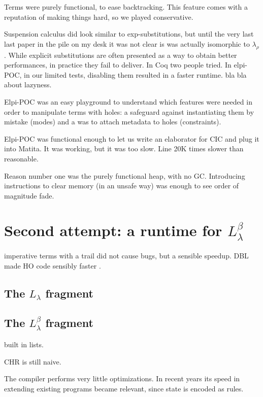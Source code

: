 \documentclass[a4paper, 11pt]{book}
\begin{document}
Terms were purely functional, to ease backtracking. This feature comes
with a reputation of making things hard, so we played conservative.

Suspension calculus did look similar to exp-substitutions, but until the very
last last paper in the pile on my desk it was not clear is was actually isomorphic
to $\lambda_\rho$. While explicit substitutions are often presented as a way to
obtain better performances, in practice they fail to deliver. In Coq two
people tried. In elpi-POC, in our limited tests, disabling them resulted in
a faster runtime.  bla bla about lazyness.

Elpi-POC was an easy playground to understand which features were needed in
order to manipulate terms with holes: a safeguard against instantiating them by
mistake (modes) and a was to attach metadata to holes (constraints).

Elpi-POC was functional enough to let us write an elaborator for CIC
and plug it into Matita. It was working, but it was too slow. Line 20K times
slower than reasonable.

Reason number one was the purely functional heap, with no GC. Introducing 
instructions to clear memory (in an unsafe way) was enough to see order of
magnitude fade.

\section{Second attempt: a runtime for $L_{\lambda}^{\beta}$}

imperative terms with a trail did not cause bugs, but a sensible speedup.
DBL made HO code sensibly faster \cite{dunchev15lpar}.

\subsection{The $L_{\lambda}$ fragment}
\subsection{The $L_{\lambda}^{\beta}$ fragment}

\cite{Michaylov1993HigherOrderLP}

built in lists.

CHR is still naive.

The compiler performs very little optimizations. In recent years its speed
in extending existing programs became relevant, since state is encoded as rules.
\end{document}
